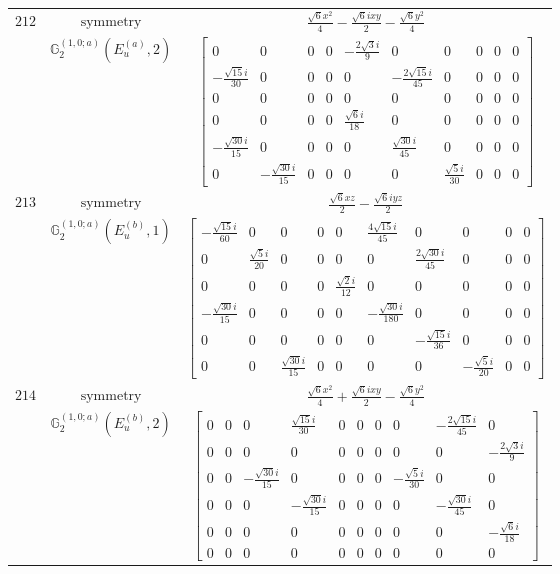 \documentclass[fleqn,8pt,landscape]{jsarticle}
\begin{document}
\begin{longtable}{ccc}
$ 212 $ & $ \text{symmetry} $ & $ \frac{\sqrt{6} x^{2}}{4} - \frac{\sqrt{6} i x y}{2} - \frac{\sqrt{6} y^{2}}{4} $ \\
$  $ & $ \mathbb{G}_{2}^{(1,0;a)}(E_{u}^{(a)},2) $ & $ \begin{bmatrix} 0 & 0 & 0 & 0 & - \frac{2 \sqrt{3} i}{9} & 0 & 0 & 0 & 0 & 0 \\ - \frac{\sqrt{15} i}{30} & 0 & 0 & 0 & 0 & - \frac{2 \sqrt{15} i}{45} & 0 & 0 & 0 & 0 \\ 0 & 0 & 0 & 0 & 0 & 0 & 0 & 0 & 0 & 0 \\ 0 & 0 & 0 & 0 & \frac{\sqrt{6} i}{18} & 0 & 0 & 0 & 0 & 0 \\ - \frac{\sqrt{30} i}{15} & 0 & 0 & 0 & 0 & \frac{\sqrt{30} i}{45} & 0 & 0 & 0 & 0 \\ 0 & - \frac{\sqrt{30} i}{15} & 0 & 0 & 0 & 0 & \frac{\sqrt{5} i}{30} & 0 & 0 & 0 \end{bmatrix} $ \\ \hline
$ 213 $ & $ \text{symmetry} $ & $ \frac{\sqrt{6} x z}{2} - \frac{\sqrt{6} i y z}{2} $ \\
$  $ & $ \mathbb{G}_{2}^{(1,0;a)}(E_{u}^{(b)},1) $ & $ \begin{bmatrix} - \frac{\sqrt{15} i}{60} & 0 & 0 & 0 & 0 & \frac{4 \sqrt{15} i}{45} & 0 & 0 & 0 & 0 \\ 0 & \frac{\sqrt{5} i}{20} & 0 & 0 & 0 & 0 & \frac{2 \sqrt{30} i}{45} & 0 & 0 & 0 \\ 0 & 0 & 0 & 0 & \frac{\sqrt{2} i}{12} & 0 & 0 & 0 & 0 & 0 \\ - \frac{\sqrt{30} i}{15} & 0 & 0 & 0 & 0 & - \frac{\sqrt{30} i}{180} & 0 & 0 & 0 & 0 \\ 0 & 0 & 0 & 0 & 0 & 0 & - \frac{\sqrt{15} i}{36} & 0 & 0 & 0 \\ 0 & 0 & \frac{\sqrt{30} i}{15} & 0 & 0 & 0 & 0 & - \frac{\sqrt{5} i}{20} & 0 & 0 \end{bmatrix} $ \\ \hline
$ 214 $ & $ \text{symmetry} $ & $ \frac{\sqrt{6} x^{2}}{4} + \frac{\sqrt{6} i x y}{2} - \frac{\sqrt{6} y^{2}}{4} $ \\
$  $ & $ \mathbb{G}_{2}^{(1,0;a)}(E_{u}^{(b)},2) $ & $ \begin{bmatrix} 0 & 0 & 0 & \frac{\sqrt{15} i}{30} & 0 & 0 & 0 & 0 & - \frac{2 \sqrt{15} i}{45} & 0 \\ 0 & 0 & 0 & 0 & 0 & 0 & 0 & 0 & 0 & - \frac{2 \sqrt{3} i}{9} \\ 0 & 0 & - \frac{\sqrt{30} i}{15} & 0 & 0 & 0 & 0 & - \frac{\sqrt{5} i}{30} & 0 & 0 \\ 0 & 0 & 0 & - \frac{\sqrt{30} i}{15} & 0 & 0 & 0 & 0 & - \frac{\sqrt{30} i}{45} & 0 \\ 0 & 0 & 0 & 0 & 0 & 0 & 0 & 0 & 0 & - \frac{\sqrt{6} i}{18} \\ 0 & 0 & 0 & 0 & 0 & 0 & 0 & 0 & 0 & 0 \end{bmatrix} $ \\ \hline

\end{longtable}
\end{document}
